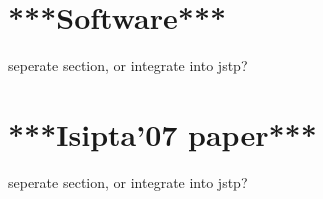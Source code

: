 \section{***Software***}

seperate section, or integrate into jstp?

\section{***Isipta'07 paper***}

seperate section, or integrate into jstp?

